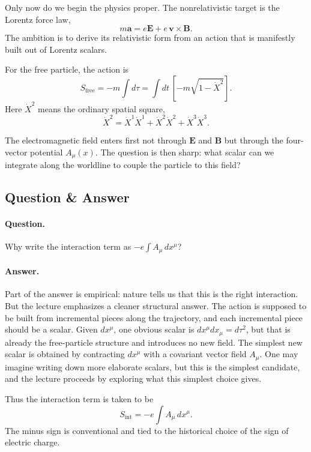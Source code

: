 Only now do we begin the physics proper. The nonrelativistic target is the Lorentz force law,
\begin{equation}
m\mathbf a=e\mathbf E+e\,\mathbf v\times\mathbf B.
\end{equation}
The ambition is to derive its relativistic form from an action that is manifestly built out of Lorentz scalars.

For the free particle, the action is
\begin{equation}
S_{\mathrm{free}}=-m\int d\tau
=
\int dt\,\left[-m\sqrt{1-\dot X^2}\right].
\end{equation}
Here $\dot X^2$ means the ordinary spatial square,
\begin{equation}
\dot X^2=\dot X^1\dot X^1+\dot X^2\dot X^2+\dot X^3\dot X^3.
\end{equation}

The electromagnetic field enters first not through $\mathbf E$ and $\mathbf B$ but through the four-vector potential $A_\mu(x)$. The question is then sharp: what scalar can we integrate along the worldline to couple the particle to this field?

\subsection{Question \& Answer}

\paragraph{Question.} Why write the interaction term as $-e\int A_\mu\,dx^\mu$?

\paragraph{Answer.} Part of the answer is empirical: nature tells us that this is the right interaction. But the lecture emphasizes a cleaner structural answer. The action is supposed to be built from incremental pieces along the trajectory, and each incremental piece should be a scalar. Given $dx^\mu$, one obvious scalar is $dx^\mu dx_\mu=d\tau^2$, but that is already the free-particle structure and introduces no new field. The simplest new scalar is obtained by contracting $dx^\mu$ with a covariant vector field $A_\mu$. One may imagine writing down more elaborate scalars, but this is the simplest candidate, and the lecture proceeds by exploring what this simplest choice gives.

Thus the interaction term is taken to be
\begin{equation}
S_{\mathrm{int}}=-e\int A_\mu\,dx^\mu.
\end{equation}
The minus sign is conventional and tied to the historical choice of the sign of electric charge.


